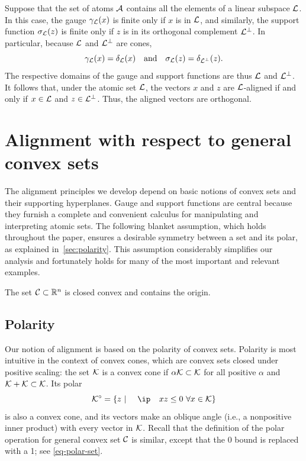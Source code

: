   \begin{example} \label{example-linear-subspaces}

    Suppose that the set of atoms $\mathcal{A}$ contains all the elements of a
    linear subspace $\mathcal{L}$. In this case, the gauge $\gamma_{\mathcal{L}}(x)$
    is finite only if $x$ is in $\mathcal{L}$, and similarly, the support
    function $\sigma_{\mathcal{L}}(z)$ is finite only if $z$ is in its
    orthogonal complement $\mathcal{L}^\perp$. In particular, because $\mathcal{L}$ and
    $\mathcal{L}^\perp$ are cones,
    \[
      \gamma_{\mathcal{L}}(x) = \delta_{\mathcal{L}}(x)
      \hbox{\quad and\quad}
      \sigma_{\mathcal{L}}(z) = \delta_{\mathcal{L}^\perp}(z).
    \]
  The respective domains of the
    gauge and support functions are thus $\mathcal{L}$ and $\mathcal{L}^\perp$. It
    follows that, under the atomic set $\mathcal{L}$, the vectors $x$ and $z$ are
    $\mathcal{L}$-aligned if and only if $x\in\mathcal{L}$ and $z\in\mathcal{L}^\perp$. Thus, the aligned
    vectors are orthogonal.
  \end{example}
  

\section{Alignment with respect to general convex sets} \label{sec:convexanalysis}

The alignment principles we develop depend on basic notions of convex sets and
their supporting hyperplanes. Gauge and support functions are central because
they furnish a complete and convenient calculus for manipulating and
interpreting atomic sets. The following blanket assumption, which holds
throughout the paper, ensures a desirable symmetry between a set and its polar,
as explained in~\autoref{sec:polarity}. This assumption considerably simplifies our
analysis and fortunately holds for many of the most important and relevant
examples.
\begin{assumption} \label{blanket-assumption} The set
  $\mathcal{C}\subset\mathbb{R}^n$ is closed convex and contains the origin.
\end{assumption}

\subsection{Polarity} \label{sec:polarity}

Our notion of alignment is based on the polarity of convex sets. Polarity is
most intuitive in the context of convex cones, which are convex sets closed
under positive scaling: the set $\mathcal{K}$ is a convex cone if
$\alpha\mathcal{K}\subset\mathcal{K}$ for all positive $\alpha$ and $\mathcal{K} + \mathcal{K} \subset
\mathcal{K}$. Its polar
\begin{equation} \label{eq-polar-cone}
  \Kscr\polar=\{z ~|~ \ip x z \le 0 \ \forall x\in\Kscr\}
\end{equation}
is also a convex cone, and its vectors make an oblique angle (i.e., a
nonpositive inner product) with every vector in $\mathcal{K}$. Recall that the definition of the polar operation for general convex set $\mathcal{C}$ is similar, except that the 0
bound is replaced with a 1; see \eqref{eq-polar-set}.

